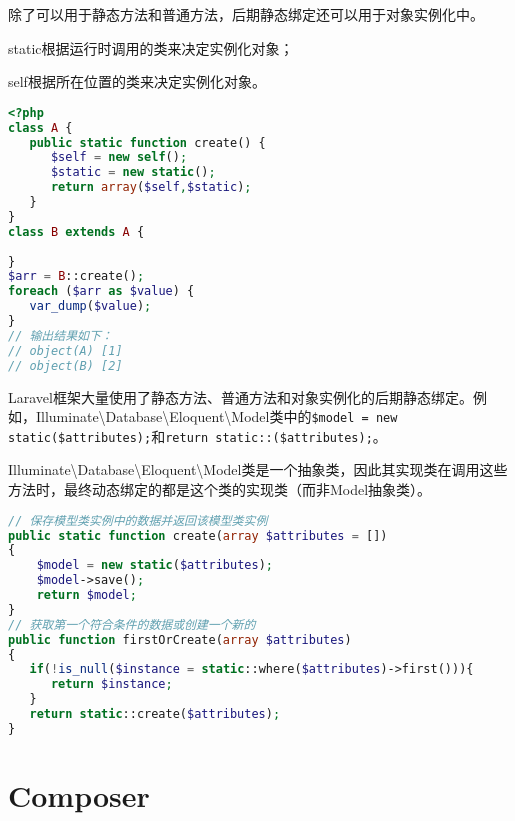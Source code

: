 除了可以用于静态方法和普通方法，后期静态绑定还可以用于对象实例化中。

\begin{compactitem}
\item static根据运行时调用的类来决定实例化对象；
\item self根据所在位置的类来决定实例化对象。
\end{compactitem}


\begin{lstlisting}[language=PHP]
<?php
class A {
   public static function create() {
      $self = new self();
      $static = new static();
      return array($self,$static);
   }
}
class B extends A {
   
}
$arr = B::create();
foreach ($arr as $value) {
   var_dump($value);
}
// 输出结果如下：
// object(A) [1]
// object(B) [2]
\end{lstlisting}

Laravel框架大量使用了静态方法、普通方法和对象实例化的后期静态绑定。例如，Illuminate\textbackslash Database\textbackslash Eloquent\textbackslash Model类中的\texttt{\$model = new static(\$attributes);}和\texttt{return static::(\$attributes);}。

Illuminate\textbackslash Database\textbackslash Eloquent\textbackslash Model类是一个抽象类，因此其实现类在调用这些方法时，最终动态绑定的都是这个类的实现类（而非Model抽象类）。


\begin{lstlisting}[language=PHP]
// 保存模型类实例中的数据并返回该模型类实例
public static function create(array $attributes = [])
{
    $model = new static($attributes);
    $model->save();
    return $model;
}
// 获取第一个符合条件的数据或创建一个新的
public function firstOrCreate(array $attributes) 
{
   if(!is_null($instance = static::where($attributes)->first())){
      return $instance;
   }
   return static::create($attributes);
}
\end{lstlisting}


\chapter{Composer}

